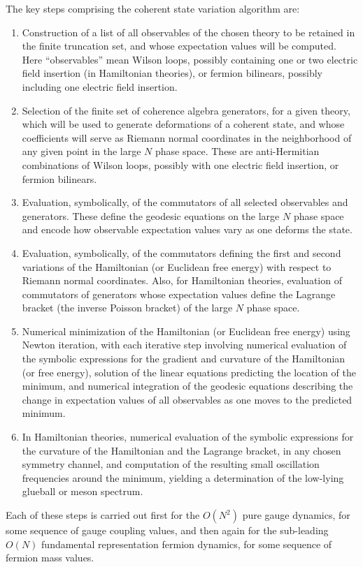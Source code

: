 \documentclass [12pt]{article}
\begin{document}
The key steps comprising the coherent state variation algorithm
\cite {CSVAII} are:
\begin{enumerate}\advance\itemsep -4pt
\item
    Construction of a list of all observables of the chosen theory
    to be retained in the finite truncation set,
    and whose expectation values will be computed.
    Here ``observables'' mean Wilson loops, possibly containing one or
    two electric field insertion (in Hamiltonian theories),
    or fermion bilinears, possibly including one electric field insertion.
\item
    Selection of the finite set of coherence algebra generators, for a given theory,
    which will be used to generate deformations of a coherent state,
    and whose coefficients will serve as Riemann normal coordinates
    in the neighborhood of any given point
    in the large $N$ phase space.
    These are anti-Hermitian combinations of Wilson loops,
    possibly with one electric field insertion, or fermion bilinears.
\item
    Evaluation, symbolically, of the commutators of all selected observables
    and generators.  These define the geodesic equations
    on the large $N$ phase space and encode how observable expectation
    values vary as one deforms the state.
\item
    Evaluation, symbolically, of the commutators defining the first and second
    variations of the Hamiltonian (or Euclidean free energy) with respect
    to Riemann normal coordinates.
    Also, for Hamiltonian theories,
    evaluation of commutators of generators whose expectation values
    define the Lagrange bracket (the inverse Poisson bracket)
    of the large $N$ phase space.
\item
    Numerical minimization of the Hamiltonian (or Euclidean
    free energy) using Newton iteration, with each iterative step
    involving numerical evaluation of the symbolic expressions
    for the gradient and curvature of the Hamiltonian (or free energy),
    solution of the linear equations predicting the location of the minimum,
    and numerical integration of the geodesic equations describing
    the change in expectation values of all observables as one moves
    to the predicted minimum.
\item
    In Hamiltonian theories,
    numerical evaluation of the symbolic expressions for the curvature of the
    Hamiltonian and the Lagrange bracket, in any chosen symmetry channel,
    and computation of the resulting
    small oscillation frequencies around the minimum,
    yielding a determination of the
    low-lying glueball or meson spectrum.
\end{enumerate}
%
Each of these steps is carried out first for the $O(N^2)$ pure gauge dynamics,
for some sequence of gauge coupling values,
and then again for the sub-leading $O(N)$ fundamental representation
fermion dynamics,
for some sequence of fermion mass values.
\end{document}
